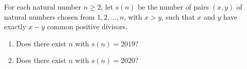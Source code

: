 For each natural number $n\ge2$, let $s(n)$ be the number of pairs $(x,y)$ of natural numbers chosen from $1,2,\dots,n$, with $x>y$, such that $x$ and $y$ have exactly $x-y$ common positive divisors.
\begin{enumerate}
\item Does there exist $n$ with $s(n)=2019$?
\item Does there exist $n$ with $s(n)=2020$?
\end{enumerate}
